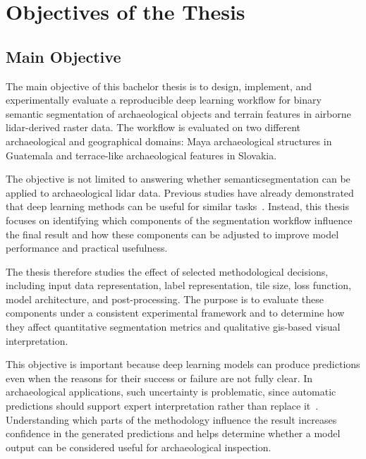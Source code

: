 
\chapter{Objectives of the Thesis}\label{ch:objectives}

\section{Main Objective}

The main objective of this bachelor thesis is to design, implement, and experimentally evaluate a reproducible deep learning workflow for binary semantic segmentation of archaeological objects and terrain features in airborne \gls{lidar}-derived raster data. The workflow is evaluated on two different archaeological and geographical domains: Maya archaeological structures in Guatemala and terrace-like archaeological features in Slovakia.

The objective is not limited to answering whether \gls{semanticsegmentation} can be applied to archaeological \gls{lidar} data. Previous studies have already demonstrated that deep learning methods can be useful for similar tasks~\cite{bundzel_semantic_2020,somrak_learning_2020,verschoof-van_der_vaart_combining_2020,guyot_objective_2021,trier_using_2019}. Instead, this thesis focuses on identifying which components of the segmentation workflow influence the final result and how these components can be adjusted to improve model performance and practical usefulness.

The thesis therefore studies the effect of selected methodological decisions, including input data representation, label representation, tile size, loss function, model architecture, and post-processing. The purpose is to evaluate these components under a consistent experimental framework and to determine how they affect quantitative segmentation metrics and qualitative \gls{gis}-based visual interpretation.

This objective is important because deep learning models can produce predictions even when the reasons for their success or failure are not fully clear. In archaeological applications, such uncertainty is problematic, since automatic predictions should support expert interpretation rather than replace it~\cite{bundzel_semantic_2020,fiorucci_deep_2022,verschoof-van_der_vaart_combining_2020,fylaktos_deep_2025}. Understanding which parts of the methodology influence the result increases confidence in the generated predictions and helps determine whether a model output can be considered useful for archaeological inspection.

